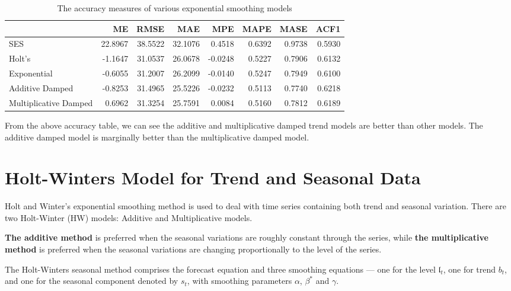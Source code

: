 \documentclass[
]{book}
\begin{document}
\begin{table}

\caption{\label{tab:unnamed-chunk-230}The accuracy measures of various exponential 
      smoothing models}
\centering
\begin{tabular}[t]{l|r|r|r|r|r|r|r}
\hline
  & ME & RMSE & MAE & MPE & MAPE & MASE & ACF1\\
\hline
SES & 22.8967 & 38.5522 & 32.1076 & 0.4518 & 0.6392 & 0.9738 & 0.5930\\
\hline
Holt's & -1.1647 & 31.0537 & 26.0678 & -0.0248 & 0.5227 & 0.7906 & 0.6132\\
\hline
Exponential & -0.6055 & 31.2007 & 26.2099 & -0.0140 & 0.5247 & 0.7949 & 0.6100\\
\hline
Additive Damped & -0.8253 & 31.4965 & 25.5226 & -0.0232 & 0.5113 & 0.7740 & 0.6218\\
\hline
Multiplicative Damped & 0.6962 & 31.3254 & 25.7591 & 0.0084 & 0.5160 & 0.7812 & 0.6189\\
\hline
\end{tabular}
\end{table}

From the above accuracy table, we can see the additive and multiplicative damped trend models are better than other models. The additive damped model is marginally better than the multiplicative damped model.

\hypertarget{holt-winters-model-for-trend-and-seasonal-data}{%
\section{Holt-Winters Model for Trend and Seasonal Data}\label{holt-winters-model-for-trend-and-seasonal-data}}

Holt and Winter's exponential smoothing method is used to deal with time series containing both trend and seasonal variation. There are two Holt-Winter (HW) models: Additive and Multiplicative models.

\textbf{The additive method} is preferred when the seasonal variations are roughly constant through the series, while \textbf{the multiplicative method} is preferred when the seasonal variations are changing proportionally to the level of the series.

The Holt-Winters seasonal method comprises the forecast equation and three smoothing equations --- one for the level \(\mathfrak{l}_t\), one for trend \(b_t\), and one for the seasonal component denoted by \(s_t\), with smoothing parameters \(\alpha\), \(\beta^*\) and \(\gamma\).
\end{document}
